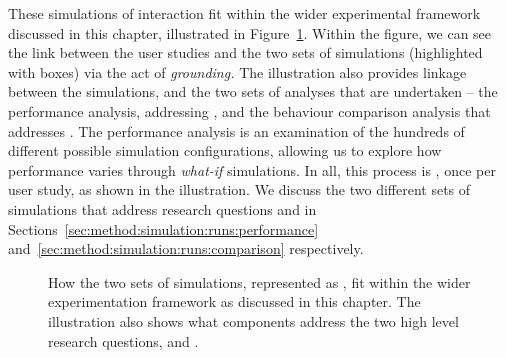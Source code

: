 These simulations of interaction fit within the wider experimental framework discussed in this chapter, illustrated in Figure~\ref{fig:sim_evaluation}. Within the figure, we can see the link between the user studies and the two sets of simulations (highlighted with  boxes) via the act of \emph{grounding.} The illustration also provides linkage between the simulations, and the two sets of analyses that are undertaken -- the performance analysis, addressing , and the behaviour comparison analysis that addresses . The performance analysis is an examination of the hundreds of different possible simulation configurations, allowing us to explore how performance varies through \emph{what-if} simulations. In all, this process is , once per user study, as shown in the illustration. We discuss the two different sets of simulations that address research questions  and  in Sections~\ref{sec:method:simulation:runs:performance} and~\ref{sec:method:simulation:runs:comparison} respectively.

\begin{figure}[t!]
    \centering
    \caption[Empirical evaluation framework]{How the two sets of simulations, represented as , fit within the wider experimentation framework as discussed in this chapter. The illustration also shows what components address the two high level research questions,  and .}
    \label{fig:sim_evaluation}
\end{figure}

